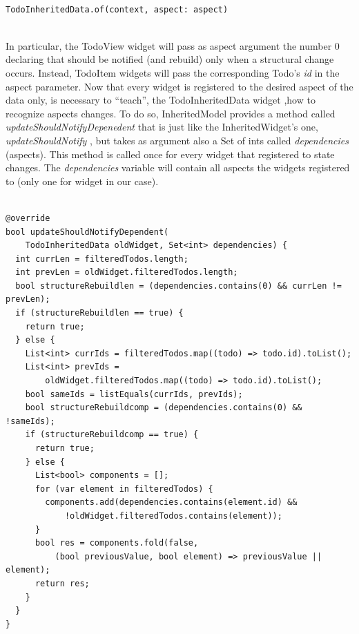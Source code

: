 \begin{code}
\label{code:2.47}
\begin{verbatim}

TodoInheritedData.of(context, aspect: aspect)
\end{verbatim}
\end{code}
\mbox{}\\
In particular, the TodoView widget will pass as aspect argument the number 0 declaring that should be notified (and rebuild) only when a structural change occurs.
Instead, TodoItem widgets will pass the corresponding Todo’s \textit{id} in the aspect parameter.
Now that every widget is registered to the desired aspect of the data only, is necessary to “teach”, the TodoInheritedData widget ,how to recognize aspects changes. To do so, InheritedModel provides a method called \textit{updateShouldNotifyDepenedent} that is just like the InheritedWidget’s one, \textit{updateShouldNotify }, but takes as argument also a Set of ints called \textit{dependencies }  (aspects). This method is called once for every widget that registered to state changes. The \textit{dependencies }  variable will contain all aspects the widgets registered to (only one for widget in our case). 
\mbox{}\\
\begin{code}

\mbox{}
\label{code:2.46}
\begin{verbatim}

@override
bool updateShouldNotifyDependent(
    TodoInheritedData oldWidget, Set<int> dependencies) {
  int currLen = filteredTodos.length;
  int prevLen = oldWidget.filteredTodos.length;
  bool structureRebuildlen = (dependencies.contains(0) && currLen != prevLen);
  if (structureRebuildlen == true) {
    return true;
  } else {
    List<int> currIds = filteredTodos.map((todo) => todo.id).toList();
    List<int> prevIds =
        oldWidget.filteredTodos.map((todo) => todo.id).toList();
    bool sameIds = listEquals(currIds, prevIds);
    bool structureRebuildcomp = (dependencies.contains(0) && !sameIds);
    if (structureRebuildcomp == true) {
      return true;
    } else {
      List<bool> components = [];
      for (var element in filteredTodos) {
        components.add(dependencies.contains(element.id) &&
            !oldWidget.filteredTodos.contains(element));
      }
      bool res = components.fold(false,
          (bool previousValue, bool element) => previousValue || element);
      return res;
    }
  }
}
\end{verbatim}
\end{code}
